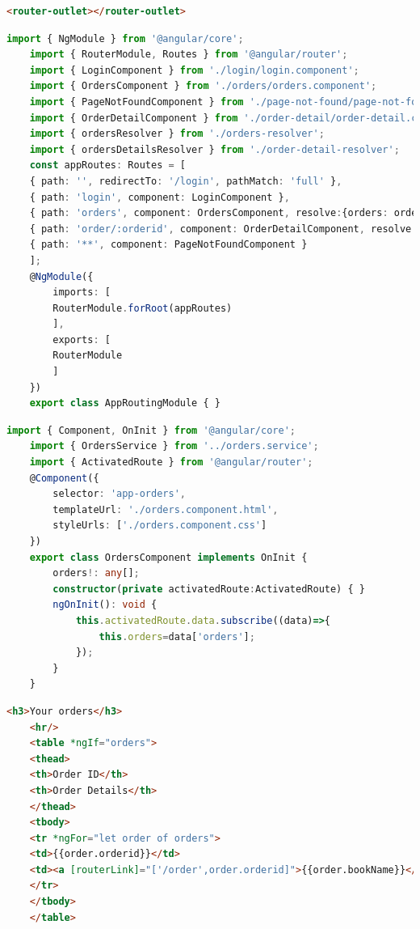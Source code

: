 \documentclass{report}
\begin{document}
\begin{lstlisting}[caption=app.component.html, language=HTML]
	<router-outlet></router-outlet>
\end{lstlisting}


\begin{lstlisting}[caption=app-routing.module.ts, language=Typescript]
	import { NgModule } from '@angular/core';
	import { RouterModule, Routes } from '@angular/router';
	import { LoginComponent } from './login/login.component';
	import { OrdersComponent } from './orders/orders.component';
	import { PageNotFoundComponent } from './page-not-found/page-not-found.component';
	import { OrderDetailComponent } from './order-detail/order-detail.component';
	import { ordersResolver } from './orders-resolver';
	import { ordersDetailsResolver } from './order-detail-resolver';
	const appRoutes: Routes = [
	{ path: '', redirectTo: '/login', pathMatch: 'full' },
	{ path: 'login', component: LoginComponent },
	{ path: 'orders', component: OrdersComponent, resolve:{orders: ordersResolver} },    
	{ path: 'order/:orderid', component: OrderDetailComponent, resolve: {order: ordersDetailsResolver} },    
	{ path: '**', component: PageNotFoundComponent }
	];
	@NgModule({
		imports: [
		RouterModule.forRoot(appRoutes)
		],
		exports: [
		RouterModule
		]
	})
	export class AppRoutingModule { }
\end{lstlisting}


\begin{lstlisting}[caption=orders.component.ts, language=Typescript]
	import { Component, OnInit } from '@angular/core';
	import { OrdersService } from '../orders.service';
	import { ActivatedRoute } from '@angular/router';
	@Component({
		selector: 'app-orders',
		templateUrl: './orders.component.html',
		styleUrls: ['./orders.component.css']
	})
	export class OrdersComponent implements OnInit {
		orders!: any[];
		constructor(private activatedRoute:ActivatedRoute) { }
		ngOnInit(): void {
			this.activatedRoute.data.subscribe((data)=>{
				this.orders=data['orders'];
			});
		}
	}

\end{lstlisting}


\begin{lstlisting}[caption=orders.component.html, language=HTML]
	<h3>Your orders</h3>
	<hr/>
	<table *ngIf="orders">
	<thead>
	<th>Order ID</th>
	<th>Order Details</th>
	</thead>
	<tbody>
	<tr *ngFor="let order of orders">
	<td>{{order.orderid}}</td>
	<td><a [routerLink]="['/order',order.orderid]">{{order.bookName}}</a>  by {{order.author}} </td>
	</tr>
	</tbody>
	</table>
\end{lstlisting}
\end{document}
